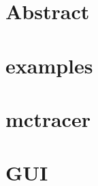 \documentclass{article}
\begin{document}
\section{Abstract} 
\section{examples} 
\section{mctracer} 
\section{GUI} 
\end{document}
